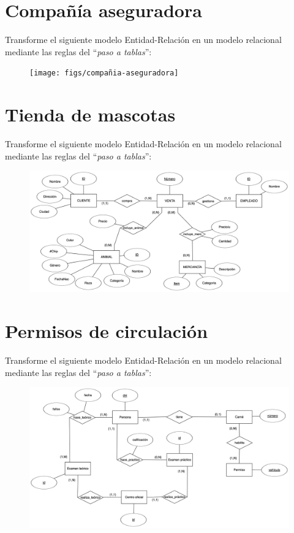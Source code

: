 \documentclass[a4paper]{article}
\begin{document}
\section{Compañía aseguradora}

Transforme el siguiente modelo Entidad-Relación en un modelo relacional mediante las reglas del ``\textit{paso a tablas}'':

\begin{figure}[H]
    \centering
    \texttt{[image: figs/compañia-aseguradora]}
\end{figure}

\section{Tienda de mascotas}

Transforme el siguiente modelo Entidad-Relación en un modelo relacional mediante las reglas del ``\textit{paso a tablas}'':

\begin{figure}[H]
    \centering
    \includegraphics[width=\textwidth]{figs/tienda-de-mascotas}
\end{figure}

\newpage
\section{Permisos de circulación}

Transforme el siguiente modelo Entidad-Relación en un modelo relacional mediante las reglas del ``\textit{paso a tablas}'':

\begin{figure}[H]
    \centering
    \includegraphics[width=\textwidth]{figs/permiso-de-circulacion}
\end{figure}
\end{document}
